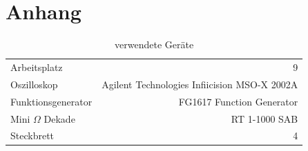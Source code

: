\documentclass[10pt,a4paper]{scrartcl}
\begin{document}


\section {Anhang}

\begin{table}[ht!]
    \centering
    \caption{verwendete Geräte} \label{tab:devices}
    \begin{tabular}{lr}
        Arbeitsplatz & 9\\
        Oszilloskop&Agilent Technologies Infiicision MSO-X 2002A\\
        Funktionsgenerator&FG1617 Function Generator\\
        Mini $\Omega$ Dekade&RT 1-1000 SAB\\
        Steckbrett & 4
    \end{tabular}
\end{table}
\end{document}
